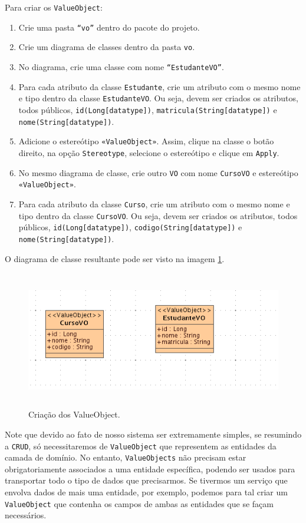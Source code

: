 Para criar os \texttt{ValueObject}:
\begin{enumerate}
  \item Crie uma pasta \texttt{“vo”} dentro do pacote do projeto.
  \item Crie um diagrama de classes dentro da pasta \texttt{vo}.
  \item No diagrama, crie uma classe com nome \texttt{“EstudanteVO”}.
  \item Para cada atributo da classe \texttt{Estudante}, crie um atributo com o
  mesmo nome e tipo dentro da classe \texttt{EstudanteVO}. Ou seja, devem ser
  criados os atributos, todos públicos, \texttt{id(Long[datatype])},
  \texttt{matricula(String[datatype])} e \texttt{nome(String[datatype])}.
  \item Adicione o estereótipo \texttt{«ValueObject»}. Assim, clique na classe o
  botão direito, na opção \texttt{Stereotype}, selecione o estereótipo e clique
  em \texttt{Apply}.
  \item No mesmo diagrama de classe, crie outro \texttt{VO} com nome
  \texttt{CursoVO} e estereótipo \texttt{«ValueObject»}.
  \item Para cada atributo da classe \texttt{Curso}, crie um atributo com o
  mesmo nome e tipo dentro da classe \texttt{CursoVO}. Ou seja, devem ser
  criados os atributos, todos públicos, \texttt{id(Long[datatype])},
  \texttt{codigo(String[datatype])} e \texttt{nome(String[datatype])}.
\end{enumerate}

O diagrama de classe resultante pode ser visto na imagem \ref{cria_value_object}.
\begin{figure}[H]
	\centering
	\includegraphics[width=350pt,height=170pt]{imgs/tutorial-mdarte-0023.png}
	\caption{Criação dos ValueObject.}
	\label{cria_value_object}
\end{figure}

Note que devido ao fato de nosso sistema ser extremamente simples, se resumindo
a \texttt{CRUD}, só necessitaremos de \texttt{ValueObject} que representem as
entidades da camada de domínio. No entanto, \texttt{ValueObjects} não precisam
estar obrigatoriamente associados a uma entidade específica, podendo ser usados
para transportar todo o tipo de dados que precisarmos. Se tivermos um serviço
que envolva dados de mais uma entidade, por exemplo, podemos para tal criar um
\texttt{ValueObject} que contenha os campos de ambas as entidades que se façam
necessários.

